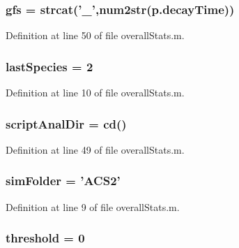 \hypertarget{a00032_a5714ee99d309183e59b051e92e5a44d1}{
\subsubsection[{gfs}]{\setlength{\rightskip}{0pt plus 5cm}gfs = strcat('\-\_\-',num2str({\bf p.\-decay\-Time}))}}\label{a00032_a5714ee99d309183e59b051e92e5a44d1}


Definition at line 50 of file overall\-Stats.\-m.

\hypertarget{a00032_aad7be196243f3c9ca83dfee7c9111014}{
\subsubsection[{last\-Species}]{ last\-Species = 2}}\label{a00032_aad7be196243f3c9ca83dfee7c9111014}


Definition at line 10 of file overall\-Stats.\-m.

\hypertarget{a00032_a2a07fff00b80967a40ae67d91fd31cb4}{
\subsubsection[{script\-Anal\-Dir}]{ script\-Anal\-Dir = {\bf cd}()}}\label{a00032_a2a07fff00b80967a40ae67d91fd31cb4}


Definition at line 49 of file overall\-Stats.\-m.

\hypertarget{a00032_aa671e3345005bd599e662bcaa115b18a}{
\subsubsection[{sim\-Folder}]{ sim\-Folder = 'A\-C\-S2'}}\label{a00032_aa671e3345005bd599e662bcaa115b18a}


Definition at line 9 of file overall\-Stats.\-m.

\hypertarget{a00032_a9ec673b91cb4ce5ba9842d584db1eea2}{
\subsubsection[{threshold}]{ threshold = 0}}\label{a00032_a9ec673b91cb4ce5ba9842d584db1eea2}


